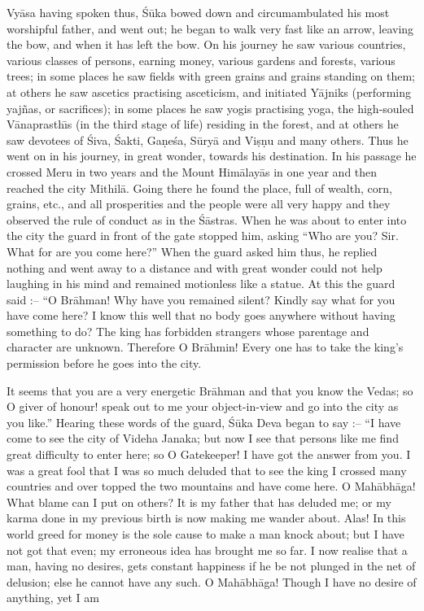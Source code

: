 Vy\=asa having spoken thus, \'S\=uka bowed down and circumambulated his most worshipful father, and went out; he began to walk very fast like an arrow, leaving the bow, and when it has left the bow. On his journey he saw various countries, various classes of persons, earning money, various gardens and forests, various trees; in some places he saw fields with green grains and grains standing on them; at others he saw ascetics practising asceticism, and initiated Y\=ajniks (performing yaj\~nas, or sacrifices); in some places he saw yogis practising yoga, the high-souled V\=anaprasth\={\i}s (in the third stage of life) residing in the forest, and at others he saw devotees of \'Siva, \'Sakti, Ga\d{n}e\'sa, S\=ury\=a and Vi\d{s}\d{n}u and many others. Thus he went on in his journey, in great wonder, towards his destination. In his passage he crossed Meru in two years and the Mount Him\=alay\=as in one year and then reached the city Mithil\=a. Going there he found the place, full of wealth, corn, grains, etc., and all prosperities and the people were all very happy and they observed the rule of conduct as in the \'S\=astras. When he was about to enter into the city the guard in front of the gate stopped him, asking ``Who are you? Sir. What for are you come here?'' When the guard asked him thus, he replied nothing and went away to a distance and with great wonder could not help laughing in his mind and remained motionless like a statue. At this the guard said :-- ``O Br\=ahman! Why have you remained silent? Kindly say what for you have come here? I know this well that no body goes anywhere without having something to do? The king has forbidden strangers whose parentage and character are unknown. Therefore O Br\=ahmin! Every one has to take the king's permission before he goes into the city.

It seems that you are a very energetic Br\=ahman and that you know the Vedas; so O giver of honour! speak out to me your object-in-view and go into the city as you like.'' Hearing these words of the guard, \'S\=uka Deva began to say :-- ``I have come to see the city of Videha Janaka; but now I see that persons like me find great difficulty to enter here; so O Gatekeeper! I have got the answer from you. I was a great fool that I was so much deluded that to see the king I crossed many countries and over topped the two mountains and have come here. O Mah\=abh\=aga! What blame can I put on others? It is my father that has deluded me; or my karma done in my previous birth is now making me wander about. Alas! In this world greed for money is the sole cause to make a man knock about; but I have not got that even; my erroneous idea has brought me so far. I now realise that a man, having no desires, gets constant happiness if he be not plunged in the net of delusion; else he cannot have any such. O Mah\=abh\=aga! Though I have no desire of anything, yet I am


